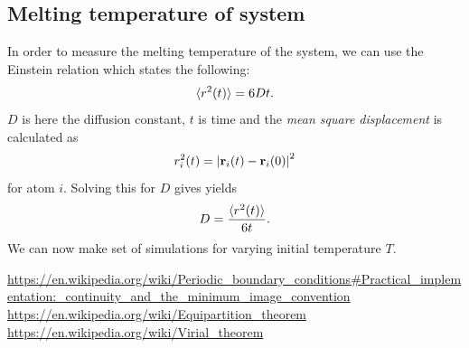 \documentclass[a4paper]{article}
\renewcommand{\vec}[1]{\mathbf{#1}}
\begin{document}
\subsection{Melting temperature of system}
\label{sub:melting_temperature_of_system}

    In order to measure the melting temperature of the system, we can use the
    Einstein relation which states the following:
    \begin{equation}
        \notag
        \langle r^2(t) \rangle = 6Dt.
    \end{equation}
    $D$ is here the diffusion constant, $t$ is time and the \emph{mean square
    displacement} is calculated as
    \begin{equation}
        \notag
        r_i^2(t) = \left| \vec{r}_i(t) - \vec{r}_i(0) \right|^2
    \end{equation}
    for atom $i$. Solving this for $D$ gives yields
    \begin{equation}
        \notag
        D = \frac{\langle r^2(t) \rangle}{6t}.
    \end{equation}
    We can now make set of simulations for varying initial temperature $T$.

\clearpage

\begin{thebibliography}{9}
    \url{https://en.wikipedia.org/wiki/Periodic_boundary_conditions#Practical_implementation:_continuity_and_the_minimum_image_convention}
    \url{https://en.wikipedia.org/wiki/Equipartition\_theorem}
    \url{https://en.wikipedia.org/wiki/Virial_theorem}
\end{thebibliography}
\end{document}
